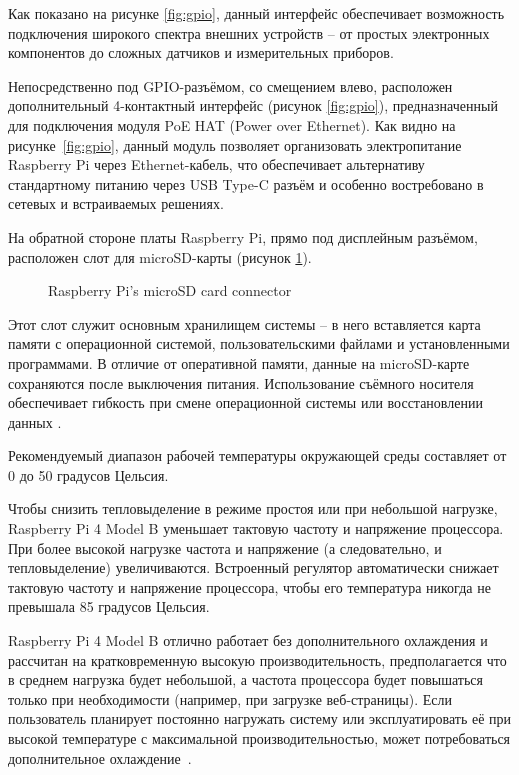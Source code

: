 Как показано на рисунке \ref{fig:gpio}, данный интерфейс обеспечивает возможность подключения широкого спектра внешних устройств -- от простых электронных компонентов  до сложных датчиков и измерительных приборов. 

Непосредственно под GPIO-разъёмом, со смещением влево, расположен дополнительный 4-контактный интерфейс (рисунок \ref{fig:gpio}), предназначенный для подключения модуля PoE HAT (Power over Ethernet). Как видно на рисунке~\ref{fig:gpio}, данный модуль позволяет организовать электропитание Raspberry Pi через Ethernet-кабель, что обеспечивает альтернативу стандартному питанию через USB Type-C разъём и особенно востребовано в сетевых и встраиваемых решениях.

На обратной стороне платы Raspberry Pi, прямо под дисплейным разъёмом, расположен слот для microSD-карты (рисунок \ref{fig:microSd}).

\begin{figure}[H]
	\centering
	\caption{Raspberry Pi’s microSD card connector}
	\label{fig:microSd}
\end{figure}

Этот слот служит основным хранилищем системы -- в него вставляется карта памяти с операционной системой, пользовательскими файлами и установленными программами. В отличие от оперативной памяти, данные на microSD-карте сохраняются после выключения питания. Использование съёмного носителя обеспечивает гибкость при смене операционной системы или восстановлении данных \cite{RaspberryPi}.

Рекомендуемый диапазон рабочей температуры окружающей среды составляет от 0 до 50 градусов Цельсия.

Чтобы снизить тепловыделение в режиме простоя или при небольшой нагрузке, Raspberry Pi 4 Model B уменьшает тактовую частоту и напряжение процессора. При более высокой нагрузке частота и напряжение (а следовательно, и тепловыделение) увеличиваются. Встроенный регулятор автоматически снижает тактовую частоту и напряжение процессора, чтобы его температура никогда не превышала 85 градусов Цельсия.

Raspberry Pi 4 Model B отлично работает без дополнительного охлаждения и рассчитан на кратковременную высокую производительность, предполагается что в среднем нагрузка будет небольшой, а частота процессора будет повышаться только при необходимости (например, при загрузке веб-страницы). Если пользователь планирует постоянно нагружать систему или эксплуатировать её при высокой температуре с максимальной производительностью, может потребоваться дополнительное охлаждение~\cite{RaspberryPi_DATASHEET}.




\newpage
